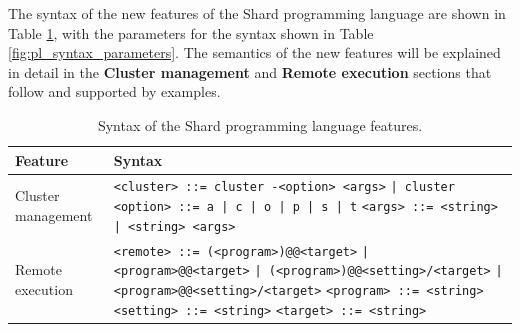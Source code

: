 \documentclass[oneside]{report}
\begin{document}
The syntax of the new features of the Shard programming language are shown in Table \ref{fig:pl_syntax}, with the parameters for the syntax shown in Table \ref{fig:pl_syntax_parameters}.
The semantics of the new features will be explained in detail in the \textbf{Cluster management} and \textbf{Remote execution} sections that follow and supported by examples.

\begin{table}[h]
  \begin{center}
    \begin{tabularx}{\textwidth}{|l|X|}
      \hline
      Feature            & Syntax                                                   \\ \hline
      Cluster management & \texttt{<cluster> ::= cluster -<option> <args>} \newline
      \texttt{| cluster} \newline
      \texttt{<option> ::= a | c | o | p | s | t} \newline
      \texttt{<args> ::= <string>} \newline
      \texttt{| <string> <args>}
      \\ \hline
      Remote execution   &
      \texttt{<remote> ::= (<program>)@@<target>}
      \newline \texttt{| <program>@@<target>}
      \newline \texttt{| (<program>)@@<setting>/<target>}
      \newline \texttt{| <program>@@<setting>/<target>} \newline
      \texttt{<program> ::= <string>} \newline
      \texttt{<setting> ::= <string>} \newline
      \texttt{<target> ::= <string>}
      \\ \hline
    \end{tabularx}
    \caption{Syntax of the Shard programming language features.}
    \label{fig:pl_syntax}
  \end{center}
\end{table}
\end{document}
